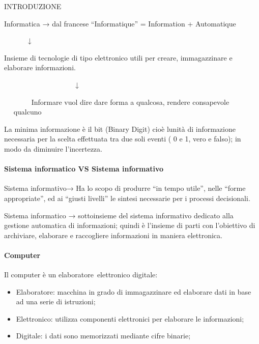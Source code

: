 \documentclass[
]{article}
\author{}
\date{}
\providecommand{\tightlist}{%
  \setlength{\itemsep}{0pt}\setlength{\parskip}{0pt}}
\begin{document}
{}

{INTRODUZIONE}

{}

{Informatica → dal francese ``}{Informatique}{'' = Information +
Automatique}

{~ ~ ~ ~ ↓}

{Insieme di tecnologie di tipo elettronico utili per creare,
immagazzinare e elaborare }{informazioni}{.}

{~ ~ ~ ~ ~ ~ ~ ~ ~ ~ ~ ~ ↓}

{~ ~ ~ ~ ~Informare vuol dire dare forma a qualcosa, rendere consapevole
~ ~ ~ ~ ~ ~ ~qualcuno }

{}

{La minima informazione è il bit (Binary Digit) cioè
l\textquotesingle unità di informazione necessaria per la scelta
effettuata tra due soli eventi ( 0 e 1, vero e falso); in modo da
diminuire l'incertezza.}

{}

{}

\paragraph{\texorpdfstring{{Sistema informatico VS Sistema
informativo}}{Sistema informatico VS Sistema informativo}}\label{h.ifxnqepgtsj6}

{Sistema informativo}{→ Ha lo scopo di produrre ``in tempo utile'',
nelle ``forme appropriate'', ed ai ``giusti livelli'' le sintesi
necessarie per i processi decisionali. }

{}

{Sistema informatico }{→ sottoinsieme del sistema informativo dedicato
alla gestione automatica di informazioni; quindi è l'insieme di parti
con l'obiettivo di archiviare, elaborare e raccogliere informazioni in
maniera elettronica.}

{}

{}

\paragraph{\texorpdfstring{{Computer}}{Computer}}\label{h.au2vel7tzgss}

{Il computer è un }{elaboratore}{~}{elettronico digitale}{:}

{}

\begin{itemize}
\tightlist
\item
  {Elaboratore}{: macchina in grado di immagazzinare ed elaborare dati
  in base ad una serie di istruzioni;}
\item
  {Elettronico}{: utilizza componenti elettronici per elaborare le
  informazioni;}
\item
  {Digitale}{: i dati sono memorizzati mediante cifre binarie;}
\end{itemize}
\end{document}
